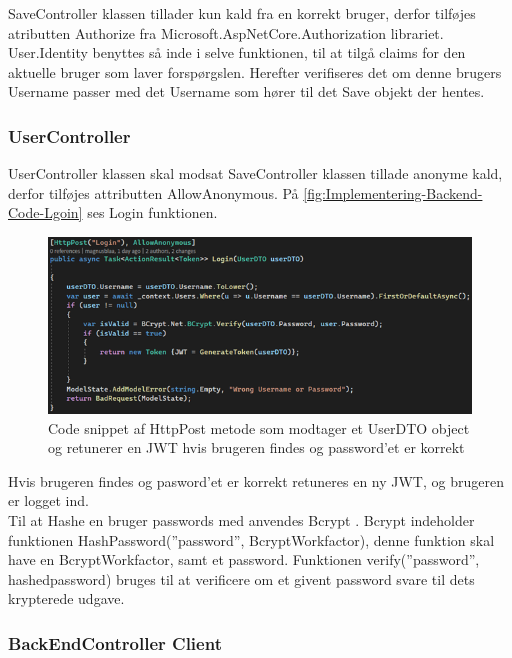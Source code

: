 SaveController klassen tillader kun kald fra en korrekt bruger, derfor tilføjes atributten Authorize fra Microsoft.AspNetCore.Authorization librariet. User.Identity benyttes så inde i selve funktionen, til at tilgå claims for den aktuelle bruger som laver forspørgslen. Herefter verifiseres det om denne brugers Username passer med det Username som hører til det Save objekt der hentes.\\  

    

\subsubsection{UserController}

UserController klassen skal modsat SaveController klassen tillade anonyme kald, derfor tilføjes attributten AllowAnonymous. På \autoref{fig:Implementering-Backend-Code-Lgoin} ses Login funktionen.

\begin{figure}[H]
\centering
\includegraphics[width = \textwidth]{02-Body/Images/Backend_Code_Login.PNG}
\caption{Code snippet af HttpPost metode som modtager et UserDTO object og retunerer en JWT hvis brugeren findes og password’et er korrekt}
\label{fig:Implementering-Backend-Code-Lgoin}
\end{figure}


Hvis brugeren findes og pasword'et er korrekt retuneres en ny JWT, og brugeren er logget ind.\\

Til at Hashe en bruger passwords med anvendes Bcrypt \cite{Bcrypt}. Bcrypt indeholder funktionen HashPassword(”password”, BcryptWorkfactor), denne funktion skal have en BcryptWorkfactor, samt et password. Funktionen verify(”password”, hashedpassword) bruges til at verificere om et givent password svare til dets krypterede udgave.\\


\subsubsection{BackEndController Client}

